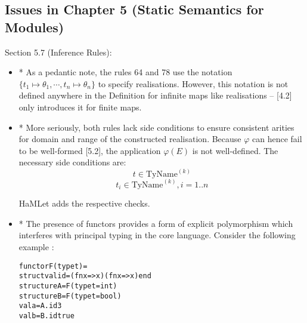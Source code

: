 \documentclass[twoside,titlepage]{article}
\begin{document}
\begin{appendix}
\begin{itemize}
\begin{enumerate}
\end{enumerate}

\end{itemize}


\subsection{Issues in Chapter 5 (Static Semantics for Modules)}
\label{bugschapter5}

Section 5.7 (Inference Rules):

\begin{itemize}
\item * As a pedantic note, the rules 64 and 78 use the notation $\{t_1\mapsto\theta_1,\cdots,t_n\mapsto\theta_n\}$ to specify realisations. However, this notation is not defined anywhere in the Definition for infinite maps like realisations -- [4.2] only introduces it for finite maps.

\item * More seriously, both rules lack side conditions to ensure consistent arities for domain and range of the constructed realisation. Because $\varphi$ can hence fail to be well-formed [5.2], the application $\varphi(E)$ is not well-defined. The necessary side conditions are:
\setcounter{equation}{63}
\begin{equation}
t \in \mbox{TyName}^{(k)}
\end{equation}
\vspace{-\baselineskip}
\setcounter{equation}{77}
\begin{equation}
t_i \in \mbox{TyName}^{(k)}, i = 1..n
\end{equation}

HaMLet adds the respective checks.

\item * The presence of functors provides a form of explicit polymorphism which interferes with principal typing in the core language. Consider the following example \cite{principalmodules}:

\begin{quoting}
\begin{alltt}
functor F(type t) =
  struct val id = (fn x => x) (fn x => x) end
structure A = F(type t = int)
structure B = F(type t = bool)
val a = A.id 3
val b = B.id true
\end{alltt}
\end{quoting}


\end{itemize}
\end{appendix}
\end{document}
